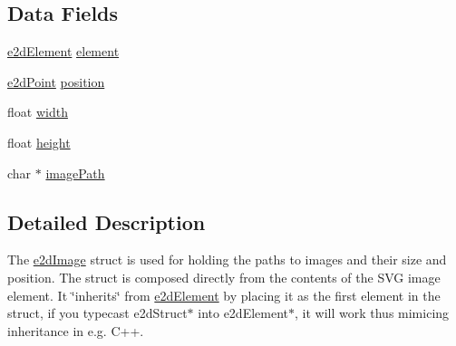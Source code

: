 \subsection*{Data Fields}
\begin{DoxyCompactItemize}
\item 
\hyperlink{structe2d_element}{e2d\-Element} \hyperlink{structe2d_image_a55bc7a3a0af41fba9e5b91f390c5928c}{element}
\item 
\hyperlink{structe2d_point}{e2d\-Point} \hyperlink{structe2d_image_afa8983f25fd6aa6aca18feb07d8d2249}{position}
\item 
float \hyperlink{structe2d_image_ae426f00e82704fa09578f5446e22d915}{width}
\item 
float \hyperlink{structe2d_image_a48083b65ac9a863566dc3e3fff09a5b4}{height}
\item 
char $\ast$ \hyperlink{structe2d_image_afb14ab23ba86115c3b01ad4122943f89}{image\-Path}
\end{DoxyCompactItemize}


\subsection{Detailed Description}
The \hyperlink{structe2d_image}{e2d\-Image} struct is used for holding the paths to images and their size and position. The struct is composed directly from the contents of the S\-V\-G image element. It \char`\"{}inherits\char`\"{} from \hyperlink{structe2d_element}{e2d\-Element} by placing it as the first element in the struct, if you typecast e2d\-Struct$\ast$ into e2d\-Element$\ast$, it will work thus mimicing inheritance in e.\-g. C++. 

